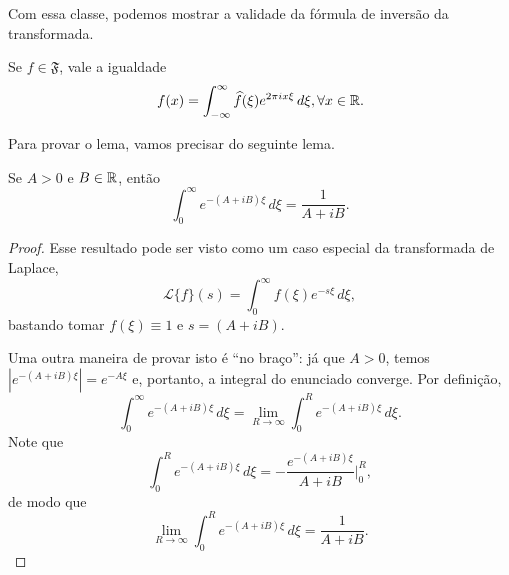         Com essa classe, podemos mostrar a validade da fórmula de inversão da transformada.
        \begin{teorema}
        \label{teo-inv-transf-fourier}
            Se $f\in\mathfrak{F}$, vale a igualdade
            \begin{equation*}
                f(x) = \int_{-\infty}^{\infty} \widehat{f}(\xi) e^{2\pi ix\xi} \, d\xi, \forall x\in\mathbb{R}.
            \end{equation*}
        \end{teorema}
        Para provar o lema, vamos precisar do seguinte lema.
        \begin{lema}
        \label{lema-int-exp}
            Se $A>0$ e $B\in\mathbb{R}$, então
            \begin{equation*}
                \int_0^{\infty} e^{-(A+iB)\xi} \, d\xi = \frac{1}{A+iB}.
            \end{equation*}
        \end{lema}
        \begin{proof}
            Esse resultado pode ser visto como um caso especial da transformada de Laplace,
            \begin{equation*}
                \mathcal{L}\{f\}(s) = \int_0^{\infty} f(\xi) e^{-s\xi} \, d\xi,
            \end{equation*}
            bastando tomar $f(\xi)\equiv 1$ e $s = (A+iB)$.
            
            Uma outra maneira de provar isto é ``no braço'': já que $A > 0$, temos $|e^{-(A+iB)\xi}| = e^{-A\xi}$
            e, portanto, a integral do enunciado converge. Por definição,
            \begin{equation*}
                \int_0^{\infty} e^{-(A+iB)\xi} \, d\xi = \lim_{R\to\infty} \int_0^R e^{-(A+iB)\xi} \, d\xi.
            \end{equation*}
            Note que
            \begin{equation*}
                \int_0^R e^{-(A+iB)\xi} \, d\xi = -\frac{e^{-(A+iB)\xi}}{A+iB}\Bigg|_0^R,
            \end{equation*}
            de modo que
            \begin{equation*}
                \lim_{R\to\infty} \int_0^R e^{-(A+iB)\xi} \, d\xi = \frac{1}{A+iB}.
            \end{equation*}
        \end{proof}
        
